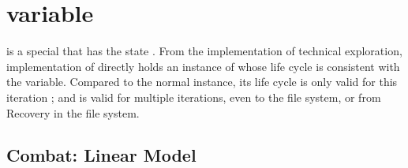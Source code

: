 \begin{savequote}[45mm]
\end{savequote}

\chapter{variable} 
\label{ch:variable}

\begin{content}

 is a special  that has the state . From the implementation of technical exploration,  implementation of  directly holds an instance of  whose life cycle is consistent with the variable. Compared to the normal  instance, its life cycle is only valid for this iteration ; and  is valid for multiple iterations, even to the file system, or from Recovery in the file system.

\end{content}

\section{Combat: Linear Model}

